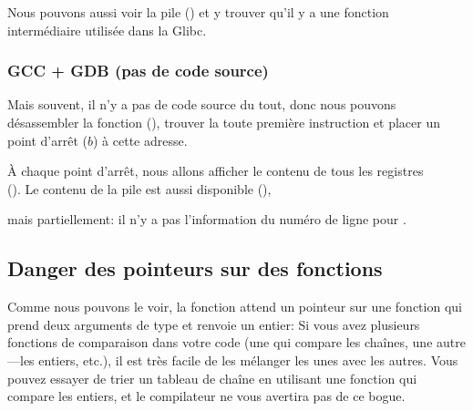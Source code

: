 Nous pouvons aussi voir la pile () et y trouver qu'il y a une fonction intermédiaire
 utilisée dans la Glibc.



\subsubsection{GCC + GDB (pas de code source)}

Mais souvent, il n'y a pas de code source du tout, donc nous pouvons désassembler
la fonction \comp (), trouver la toute première instruction \CMP et placer
un point d'arrêt ($b$) à cette adresse.

À chaque point d'arrêt, nous allons afficher le contenu de tous les registres\\
().
Le contenu de la pile est aussi disponible (),

mais partiellement: il n'y a pas l'information du numéro de ligne pour \comp.



\subsection{Danger des pointeurs sur des fonctions}

Comme nous pouvons le voir, la fonction \qsort attend un pointeur sur une fonction
qui prend deux arguments de type  et renvoie un entier:
Si vous avez plusieurs fonctions de comparaison dans votre code (une qui compare
les chaînes, une autre---les entiers, etc.), il est très facile de les mélanger les
unes avec les autres.
Vous pouvez essayer de trier un tableau de chaîne en utilisant une fonction qui compare
les entiers, et le compilateur ne vous avertira pas de ce bogue.

